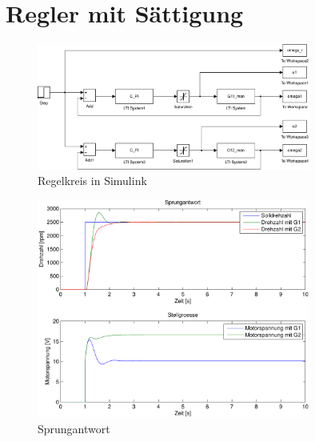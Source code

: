 \section{Regler mit Sättigung}
\begin{figure}[h!]
    \centering
    \includegraphics[width=0.8\textwidth]{11/saturation_mdl.pdf}
    \caption{Regelkreis in Simulink}
    \label{fig:11_mdl}
\end{figure}
\begin{figure}[h!]
    \centering
    \includegraphics[width=0.8\textwidth]{11/saturation_plot.pdf}
    \caption{Sprungantwort}
    \label{fig:11_sim}
\end{figure}

